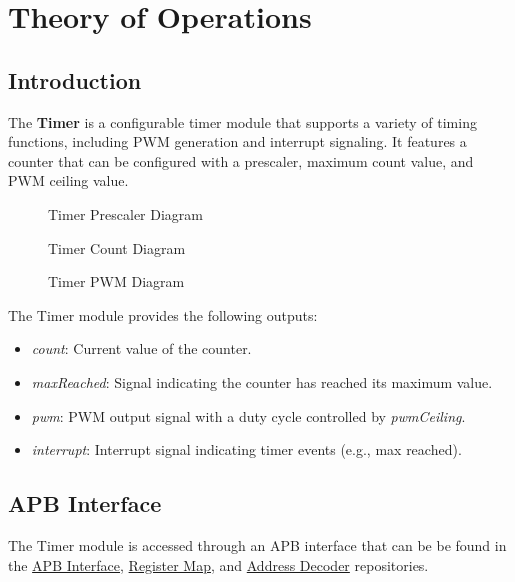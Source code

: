 \section{Theory of Operations}

\subsection{Introduction}
The \textbf{Timer} is a configurable timer module that supports a variety of timing functions,
including PWM generation and interrupt signaling. It features a counter that can be configured with a prescaler,
maximum count value, and PWM ceiling value.

\begin{figure}[h]
    
    \caption{Timer Prescaler Diagram}\label{fig:timer-prescaler}
\end{figure}

\begin{figure}[h]
    
    \caption{Timer Count Diagram}\label{fig:timer-count}
\end{figure}

\begin{figure}[h]
    
    \caption{Timer PWM Diagram}\label{fig:timer-pwm}
\end{figure}

The Timer module provides the following outputs:

\begin{itemize}[noitemsep]
    \item{\textit{count}: Current value of the counter.}
    \item{\textit{maxReached}: Signal indicating the counter has reached its maximum value.}
    \item{\textit{pwm}: PWM output signal with a duty cycle controlled by \textit{pwmCeiling}.}
    \item{\textit{interrupt}: Interrupt signal indicating timer events (e.g., max reached).}
\end{itemize}

\subsection{APB Interface}
The Timer module is accessed through an APB interface that can be be found
in the \href{https://github.com/The-Chiselers/apb}{APB Interface},
\href{https://github.com/The-Chiselers/registermap}{Register Map},
and \href{https://github.com/The-Chiselers/addrdecode}{Address Decoder} repositories.

